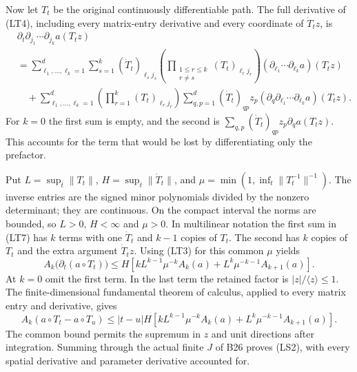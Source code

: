 \documentclass[
  11pt,
]{article}
\begin{document}
Now let \(T_t\) be the original continuously differentiable path. The
full derivative of (LT4), including every matrix-entry derivative and
every coordinate of \(\dot T_tz\), is \[
\begin{aligned}
 &\partial_t\partial_{j_1}\cdots\partial_{j_k}a(T_tz)\\
 &=\sum_{\ell_1,\ldots,\ell_k=1}^d
   \sum_{s=1}^k
       (\dot T_t)_{\ell_sj_s}
       \left(\prod_{\substack{1\le r\le k\\r\ne s}}
                    (T_t)_{\ell_rj_r}\right)
       (\partial_{\ell_1}\cdots\partial_{\ell_k}a)(T_tz)\\
 &\quad+\sum_{\ell_1,\ldots,\ell_k=1}^d
       \left(\prod_{r=1}^k(T_t)_{\ell_rj_r}\right)
       \sum_{q,p=1}^d(\dot T_t)_{qp}z_p
       (\partial_q\partial_{\ell_1}\cdots\partial_{\ell_k}a)(T_tz).
\end{aligned}
 \tag{LT7}
\] For \(k=0\) the first sum is empty, and the second is
\(\sum_{q,p}(\dot T_t)_{qp}z_p\partial_qa(T_tz)\). This accounts for the
term that would be lost by differentiating only the prefactor.

Put \(L=\sup_t\|T_t\|\), \(H=\sup_t\|\dot T_t\|\), and
\(\mu=\min(1,\inf_t\|T_t^{-1}\|^{-1})\). The inverse entries are the
signed minor polynomials divided by the nonzero determinant; they are
continuous. On the compact interval the norms are bounded, so \(L>0\),
\(H<\infty\) and \(\mu>0\). In multilinear notation the first sum in
(LT7) has \(k\) terms with one \(\dot T_t\) and \(k-1\) copies of
\(T_t\). The second has \(k\) copies of \(T_t\) and the extra argument
\(\dot T_tz\). Using (LT3) for this common \(\mu\) yields \[
 A_k\bigl(\partial_t(a\circ T_t)\bigr)
 \le H\left[kL^{k-1}\mu^{-k}A_k(a)
                 +L^k\mu^{-k-1}A_{k+1}(a)\right].
 \tag{LT8}
\] At \(k=0\) omit the first term. In the last term the retained factor
is \(|z|/\langle z\rangle\le1\). The finite-dimensional fundamental
theorem of calculus, applied to every matrix entry and derivative, gives
\[
 A_k(a\circ T_t-a\circ T_u)
 \le |t-u|H\left[kL^{k-1}\mu^{-k}A_k(a)
                 +L^k\mu^{-k-1}A_{k+1}(a)\right].
 \tag{LT9}
\] The common bound permits the supremum in \(z\) and unit directions
after integration. Summing through the actual finite \(J\) of B26 proves
(LS2), with every spatial derivative and parameter derivative accounted
for.
\end{document}
